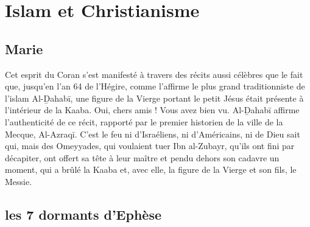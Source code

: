 \chapter{Islam et Christianisme}

\section{Marie}
Cet esprit du Coran s’est manifesté à travers des récits aussi célèbres que le fait que, jusqu’en l’an 64 de l’Hégire, comme l’affirme le plus grand traditionniste de l’islam Al-Ḏahabī, une figure de la Vierge portant le petit Jésus était présente à l’intérieur de la Kaaba. Oui, chers amis ! Vous avez bien vu. Al-Ḏahabī affirme l’authenticité de ce récit, rapporté par le premier historien de la ville de la Mecque, Al-Azraqī. C’est le feu ni d’Israéliens, ni d'Américains, ni de Dieu sait qui, mais des Omeyyades, qui voulaient tuer Ibn al-Zubayr, qu’ils ont fini par décapiter, ont offert sa tête à leur maître et pendu dehors son cadavre un moment, qui a brûlé la Kaaba et, avec elle, la figure de la Vierge et son fils, le Messie. 

\section{les 7 dormants d'Ephèse}

